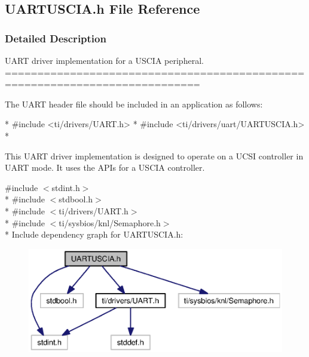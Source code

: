 \subsection{U\-A\-R\-T\-U\-S\-C\-I\-A.\-h File Reference}
\label{_u_a_r_t_u_s_c_i_a_8h}


\subsubsection{Detailed Description}
U\-A\-R\-T driver implementation for a U\-S\-C\-I\-A peripheral. ============================================================================

The U\-A\-R\-T header file should be included in an application as follows\-: 
\begin{DoxyCode}
*  #include <ti/drivers/UART.h>
*  #include <ti/drivers/uart/UARTUSCIA.h>
*  
\end{DoxyCode}


This U\-A\-R\-T driver implementation is designed to operate on a U\-C\-S\-I controller in U\-A\-R\-T mode. It uses the A\-P\-Is for a U\-S\-C\-I\-A controller. 

{\ttfamily \#include $<$stdint.\-h$>$}\\*
{\ttfamily \#include $<$stdbool.\-h$>$}\\*
{\ttfamily \#include $<$ti/drivers/\-U\-A\-R\-T.\-h$>$}\\*
{\ttfamily \#include $<$ti/sysbios/knl/\-Semaphore.\-h$>$}\\*
Include dependency graph for U\-A\-R\-T\-U\-S\-C\-I\-A.\-h\-:
\nopagebreak
\begin{figure}[H]
\begin{center}
\leavevmode
\includegraphics[width=350pt]{_u_a_r_t_u_s_c_i_a_8h__incl}
\end{center}
\end{figure}

